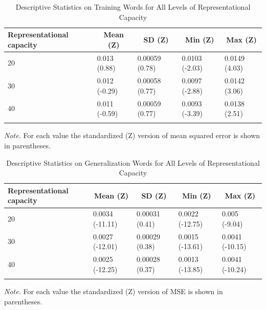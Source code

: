 \documentclass[
  ,man,floatsintext]{apa6}
\begin{document}
\begin{table}[tbp]

\begin{center}
\begin{threeparttable}

\caption{\label{tab:table4}Descriptive Statistics on Training Words for All Levels of Representational Capacity}

\begin{tabular}{lllll}
\toprule
Representational capacity & \multicolumn{1}{c}{Mean (Z)} & \multicolumn{1}{c}{SD (Z)} & \multicolumn{1}{c}{Min (Z)} & \multicolumn{1}{c}{Max (Z)}\\
\midrule
20 & 0.013 (0.88) & 0.00059 (0.78) & 0.0103 (-2.03) & 0.0149 (4.03)\\
30 & 0.012 (-0.29) & 0.00058 (0.77) & 0.0097 (-2.88) & 0.0142 (3.06)\\
40 & 0.011 (-0.59) & 0.00059 (0.77) & 0.0093 (-3.39) & 0.0138 (2.51)\\
\bottomrule
\addlinespace
\end{tabular}

\begin{tablenotes}[para]
\normalsize{\textit{Note.} For each value the standardized (Z) version of mean squared error is shown in parentheses.}
\end{tablenotes}

\end{threeparttable}
\end{center}

\end{table}

\begin{table}[tbp]

\begin{center}
\begin{threeparttable}

\caption{\label{tab:table5}Descriptive Statistics on Generalization Words for All Levels of Representational Capacity}

\begin{tabular}{lllll}
\toprule
Representational capacity & \multicolumn{1}{c}{Mean (Z)} & \multicolumn{1}{c}{SD (Z)} & \multicolumn{1}{c}{Min (Z)} & \multicolumn{1}{c}{Max (Z)}\\
\midrule
20 & 0.0034 (-11.11) & 0.00031 (0.41) & 0.0022 (-12.75) & 0.005 (-9.04)\\
30 & 0.0027 (-12.01) & 0.00029 (0.38) & 0.0015 (-13.61) & 0.0041 (-10.15)\\
40 & 0.0025 (-12.25) & 0.00028 (0.37) & 0.0013 (-13.85) & 0.0041 (-10.24)\\
\bottomrule
\addlinespace
\end{tabular}

\begin{tablenotes}[para]
\normalsize{\textit{Note.} For each value the standardized (Z) version of MSE is shown in parentheses.}
\end{tablenotes}

\end{threeparttable}
\end{center}

\end{table}
\end{document}
